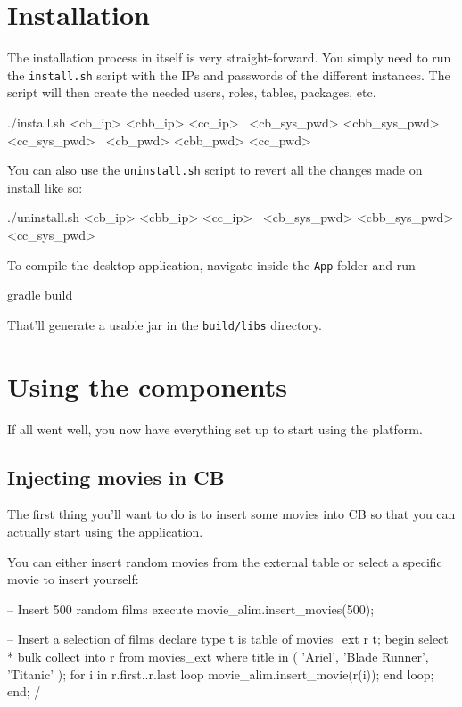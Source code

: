 \documentclass[a4paper]{article}
\begin{document}
\section{Installation}

The installation process in itself is very straight-forward. You simply need to run the \texttt{install.sh} script with the IPs and passwords of the different instances. The script will then create the needed users, roles, tables, packages, etc.

\begin{shcode}
./install.sh <cb_ip> <cbb_ip> <cc_ip>       \
    <cb_sys_pwd> <cbb_sys_pwd> <cc_sys_pwd> \
    <cb_pwd> <cbb_pwd> <cc_pwd>
\end{shcode}

You can also use the \texttt{uninstall.sh} script to revert all the changes made on install like so:

\begin{shcode}
./uninstall.sh <cb_ip> <cbb_ip> <cc_ip> \
    <cb_sys_pwd> <cbb_sys_pwd> <cc_sys_pwd>
\end{shcode}

To compile the desktop application, navigate inside the \texttt{App} folder and run
\begin{shcode}
gradle build
\end{shcode}
That'll generate a usable jar in the \texttt{build/libs} directory.

\section{Using the components}

If all went well, you now have everything set up to start using the platform.

\subsection{Injecting movies in CB}

The first thing you'll want to do is to insert some movies into CB so that you can actually start using the application.\par
You can either insert random movies from the external table or select a specific movie to insert yourself:

\begin{sqlcode}
-- Insert 500 random films
execute movie_alim.insert_movies(500);

-- Insert a selection of films
declare
    type t is table of movies_ext%
    r t;
begin
    select * bulk collect into r from movies_ext where title in (
        'Ariel', 'Blade Runner', 'Titanic'
    );
    for i in r.first..r.last loop
        movie_alim.insert_movie(r(i));
    end loop;
end;
/
\end{sqlcode}
\end{document}
